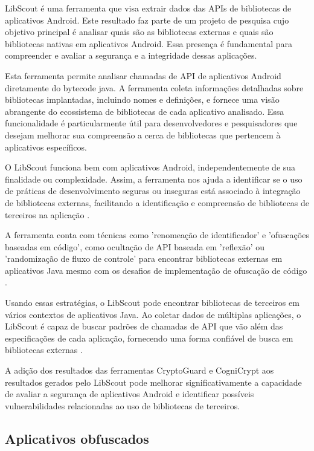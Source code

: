 LibScout é uma ferramenta que visa extrair dados das APIs de bibliotecas de aplicativos Android. \cite{LibScout} Este resultado faz parte de um projeto de pesquisa cujo objetivo principal é analisar quais são as bibliotecas externas e quais são bibliotecas nativas em aplicativos Android. \cite{LibScout} Essa presença é fundamental para compreender e avaliar a segurança e a integridade dessas aplicações.

Esta ferramenta permite analisar chamadas de API de aplicativos Android diretamente do bytecode java. \cite{LibScout} A ferramenta coleta informações detalhadas sobre bibliotecas implantadas, incluindo nomes e definições, e fornece uma visão abrangente do ecossistema de bibliotecas de cada aplicativo analisado. \cite{LibScout} Essa funcionalidade é particularmente útil para desenvolvedores e pesquisadores que desejam melhorar sua compreensão a cerca de bibliotecas que pertencem à aplicativos específicos.

O LibScout funciona bem com aplicativos Android, independentemente de sua finalidade ou complexidade. \cite{LibScout} Assim, a ferramenta nos ajuda a identificar se o uso de práticas de desenvolvimento seguras ou inseguras está associado à integração de bibliotecas externas, facilitando a identificação e compreensão de bibliotecas de terceiros na aplicação \cite{LibScout}.

A ferramenta conta com técnicas como 'renomeação de identificador'\cite{LibScout} e 'ofuscações baseadas em código', como ocultação de API baseada em 'reflexão' ou 'randomização de fluxo de controle' para encontrar bibliotecas externas em aplicativos Java mesmo com os desafios de implementação de ofuscação de código \cite{LibScout}. \cite{LibScout} 

Usando essas estratégias, o LibScout pode encontrar bibliotecas de terceiros em vários contextos de aplicativos Java. Ao coletar dados de múltiplas aplicações, o LibScout é capaz de buscar padrões de chamadas de API que vão além das especificações de cada aplicação, fornecendo uma forma confiável de busca em bibliotecas externas \cite{LibScout}.

A adição dos resultados das ferramentas CryptoGuard e CogniCrypt aos resultados gerados pelo LibScout pode melhorar significativamente a capacidade de avaliar a segurança de aplicativos Android e identificar possíveis vulnerabilidades relacionadas ao uso de bibliotecas de terceiros.

\subsection{Aplicativos obfuscados} %

